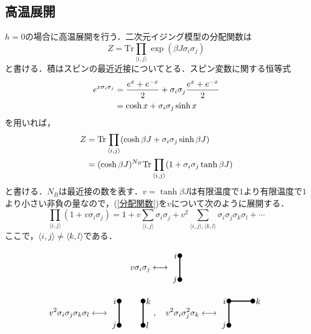 \documentclass[a4paper,11pt]{jsreport}
\begin{document}
\subsection{高温展開}
$h=0$の場合に高温展開を行う．二次元イジング模型の分配関数は
\begin{equation}
  Z = \mathrm{Tr}\prod_{\langle i, j \rangle} \exp{(\beta J \sigma_i \sigma_j)}
\end{equation}
と書ける．積はスピンの最近近接についてとる．スピン変数に関する恒等式
\begin{align}
  e^{x\sigma_i \sigma_j}
   & = \frac{e^x + e^{-x}}{2} + \sigma_i \sigma_j \frac{e^x + e^{-x}}{2} \notag \\
   & = \cosh{x} + \sigma_i \sigma_j \sinh{x}
\end{align}
を用いれば，
\begin{align}
  Z
   & = \mathrm{Tr}\prod_{\langle i, j \rangle}(\cosh{\beta J} + \sigma_i \sigma_j \sinh{\beta J}) \notag                \\
   & = (\cosh{\beta J})^{N_B}\mathrm{Tr}\prod_{\langle i, j \rangle}(1 + \sigma_i \sigma_j \tanh{\beta J}) \label{分配関数}
\end{align}
と書ける．$N_B$は最近接の数を表す．$v = \tanh{\beta J}$は有限温度で$1$より有限温度で$1$より小さい非負の量なので，(\ref{分配関数})を$v$について次のように展開する．
\begin{equation}
  \prod_{\langle i, j \rangle}(1 + v \sigma_i \sigma_j)
  = 1 + v \sum_{\langle i, j \rangle} \sigma_i \sigma_j
  + v^2 \sum_{\langle i, j \rangle, \langle k, l \rangle} \sigma_i \sigma_j \sigma_k \sigma_l + \cdots
\end{equation}
ここで，$\langle i, j \rangle \neq \langle k, l \rangle$である．

\begin{equation}
  v\sigma_i \sigma_j \longleftrightarrow
  \begin{tikzpicture}[baseline={([yshift=-.5ex]current bounding box.center)}]
    \draw[very thick](0,0)--(0,-1);
    \fill(0,0)circle(0.1)node[left]{$i$};
    \fill(0,-1)circle(0.1)node[left]{$j$};
  \end{tikzpicture}
\end{equation}

\begin{equation}
  v^2\sigma_i \sigma_j \sigma_k \sigma_l \longleftrightarrow
  \begin{tikzpicture}[baseline={([yshift=-.5ex]current bounding box.center)}]
    \draw[very thick](0,0)--(0,-1);
    \draw[very thick](1,0)--(1,-1);
    \fill(0,0)circle(0.1)node[left]{$i$};
    \fill(0,-1)circle(0.1)node[left]{$j$};
    \fill(1,0)circle(0.1)node[right]{$k$};
    \fill(1,-1)circle(0.1)node[right]{$l$};
  \end{tikzpicture}, \ \ \
  v^2\sigma_i \sigma_j^2 \sigma_k \longleftrightarrow
  \begin{tikzpicture}[baseline={([yshift=-.5ex]current bounding box.center)}]
    \draw[very thick](0,0)--(0,-1);
    \draw[very thick](0,0)--(1,0);
    \fill(0,0)circle(0.1)node[left]{$i$};
    \fill(0,-1)circle(0.1)node[left]{$j$};
    \fill(1,0)circle(0.1)node[right]{$k$};
  \end{tikzpicture}
\end{equation}
\end{document}
